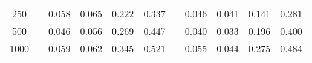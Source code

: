 % 
\begin{tabular}{ccccccccccc}
  \hline
  \hline
250 &  & 0.058 & 0.065 & 0.222 & 0.337 &  & 0.046 & 0.041 & 0.141 & 0.281 \\ 
  500 &  & 0.046 & 0.056 & 0.269 & 0.447 &  & 0.040 & 0.033 & 0.196 & 0.400 \\ 
  1000 &  & 0.059 & 0.062 & 0.345 & 0.521 &  & 0.055 & 0.044 & 0.275 & 0.484 \\ 
   \hline
\end{tabular}
